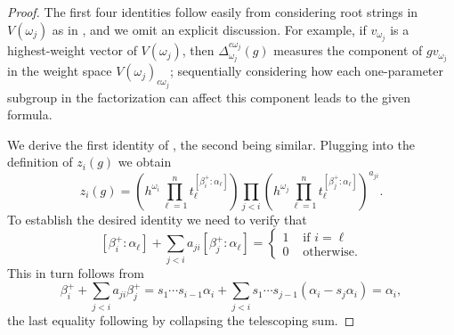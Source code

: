 \documentclass[12pt]{amsart}
\newcommand{\cvar}{z}
\theoremstyle{remark}
\numberwithin{equation}{section}
\numberwithin{figure}{section}
\begin{document}
\begin{proof}
  The first four identities follow easily from considering root strings in $V(\omega_j)$ as in \cite[Proof of eq. 3.20]{YZ08}, and we omit an explicit discussion.
  For example, if $v_{\omega_j}$ is a highest-weight vector of $V(\omega_j)$, then $\Delta^{c\omega_j}_{\omega_j}(g)$ measures the component of $gv_{\omega_j}$ in the weight space $V(\omega_j)_{c \omega_j}$; sequentially considering how each one-parameter subgroup in the factorization can affect this component leads to the given formula.

  We derive the first identity of , the second being similar.
  Plugging  into the definition of $\cvar_i(g)$ we obtain 
  \[
    \cvar_i(g)
    =
    \left(h^{\omega_i}\prod_{\ell =1}^n t_{\ell}^{[\beta_i^+:\alpha_\ell]}\right)
    \prod_{j<i}\left(h^{\omega_j}\prod_{\ell=1}^n t_{\ell}^{[\beta_j^+:\alpha_\ell]}\right)^{a_{ji}}.
  \]
  To establish the desired identity we need to verify that
  \[
    [\beta_i^+:\alpha_\ell]+\sum_{j<i}a_{ji}[\beta_j^+:\alpha_\ell]
    =
    \begin{cases}
      1 & \text{ if $i=\ell$}\\
      0 & \text{ otherwise.}
    \end{cases}
  \]
  This in turn follows from 
  \begin{equation}\label{eq:alpha_to_beta}
    \beta_i^++\sum_{j<i}a_{ji}\beta_j^+ = s_1\cdots s_{i-1}\alpha_i + \sum_{j<i}s_1\cdots s_{j-1}(\alpha_i - s_j\alpha_i)
    =
    \alpha_i,
  \end{equation}
  the last equality following by collapsing the telescoping sum.
\end{proof}
\end{document}
